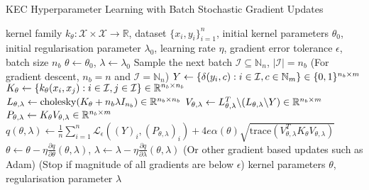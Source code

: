 \documentclass{article}
\begin{document}
	\begin{algorithm}[tb]
		\caption{KEC Hyperparameter Learning with Batch Stochastic Gradient Updates}
		\label{alg:kernel_embedding_classifier_training}
		\begin{algorithmic}[1]
			 kernel family $k_{\theta} : \mathcal{X} \times \mathcal{X} \to \mathbb{R}$, dataset $\{x_{i}, y_{i}\}_{i = 1}^{n}$, initial kernel parameters $\theta_{0}$, initial regularisation parameter $\lambda_{0}$, learning rate $\eta$, gradient error tolerance $\epsilon$, batch size $n_{b}$
			\STATE $\theta \leftarrow \theta_{0}$, $\lambda \leftarrow \lambda_{0}$
			\REPEAT
			\STATE Sample the next batch $\mathcal{I} \subseteq \mathbb{N}_{n}$, $| \mathcal{I} | = n_{b}$ \hspace{\fill} (For gradient descent, $n_{b} = n$ and $\mathcal{I} = \mathbb{N}_{n}$)
			\STATE $Y \leftarrow \{\delta(y_{i}, c) : i \in \mathcal{I}, c \in \mathbb{N}_{m}\} \hspace{\fill} \in \{0, 1\}^{n_{b} \times m}$
			\STATE $K_{\theta} \leftarrow \{k_{\theta}(x_{i}, x_{j}) : i \in \mathcal{I}, j \in \mathcal{I}\} \hspace{\fill} \in \mathbb{R}^{n_{b} \times n_{b}}$
			\STATE $L_{\theta, \lambda} \leftarrow \mathrm{cholesky}(K_{\theta} + n_{b} \lambda I_{n_{b}}) \hspace{\fill} \in \mathbb{R}^{n_{b} \times n_{b}}$
			\STATE $V_{\theta, \lambda} \leftarrow L_{\theta, \lambda}^{T} \backslash (L_{\theta, \lambda} \backslash Y) \hspace{\fill} \in \mathbb{R}^{n_{b} \times m}$
			\STATE $P_{\theta, \lambda} \leftarrow K_{\theta} V_{\theta, \lambda} \hspace{\fill} \in \mathbb{R}^{n_{b} \times m}$
			\STATE $q(\theta, \lambda) \leftarrow \frac{1}{n} \sum_{i = 1}^{n} \mathcal{L}_{\epsilon}((Y)_{i}, (P_{\theta, \lambda})_{i}) + 4 e \alpha(\theta) \sqrt{\mathrm{trace}(V_{\theta, \lambda}^{T} K_{\theta} V_{\theta, \lambda})}$
			\STATE $\theta \leftarrow \theta - \eta \frac{\partial q}{\partial \theta}(\theta, \lambda)$, $\lambda \leftarrow \lambda - \eta \frac{\partial q}{\partial \lambda}(\theta, \lambda)$ \hspace{\fill} (Or other gradient based updates such as Adam)
			 \hspace{\fill} (Stop if magnitude of all gradients are below $\epsilon$)
			 kernel parameters $\theta$, regularisation parameter $\lambda$
		\end{algorithmic}
	\end{algorithm}
		
\end{document}
